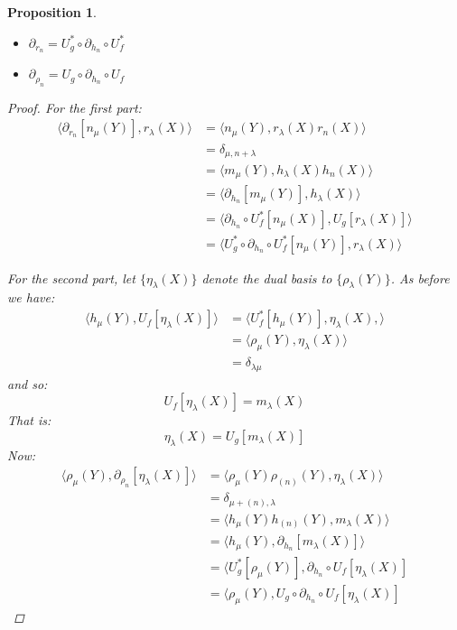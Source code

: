 \documentclass[12pt,dvips]{amsart}
\newtheorem{proposition}{Proposition}[section]
\begin{document}
\begin{proposition}
\par\bigskip
\begin{itemize}
\item $ \partial_{r_n} = U^*_g \circ \partial_{h_n} \circ U^*_f $
\item $ \partial_{\rho_n} = U_g \circ \partial_{h_n} \circ U_f $
\end{itemize}
\begin{proof}
For the first part:
\begin{align*}
\langle \partial_{r_n}[ n_\mu(Y) ], r_\lambda(X) \rangle 
& =  \langle n_\mu(Y), r_\lambda(X) r_n(X) \rangle \\
& =  \delta_{\mu, n + \lambda} \\
& =  \langle m_\mu(Y), h_\lambda(X) h_n(X) \rangle \\
& =  \langle \partial_{h_n}[m_\mu(Y)], h_\lambda(X) \rangle \\
& =  \langle \partial_{h_n} \circ U^*_{f}[n_\mu(X)], U_{g}[r_\lambda(X)] \rangle \\
& =  \langle U^*_{g} \circ \partial_{h_n} \circ U^*_{f}[n_\mu(Y)], r_\lambda(X) \rangle
\end{align*}

For the second part, let $\{\eta_\lambda(X)\}$ denote the dual basis to $\{\rho_\lambda(Y)\}$. 
As before we have:
\begin{align*}
\langle h_\mu(Y), U_{f}[\eta_\lambda(X)] \rangle 
& =  \langle U^*_{f}[h_\mu(Y)], \eta_\lambda(X),  \rangle \\
& =  \langle \rho_\mu(Y), \eta_\lambda(X)\rangle \\
& =  \delta_{\lambda \mu}
\end{align*}
and so:
$$ U_{f}[\eta_\lambda(X)] = m_\lambda(X) $$
That is:
$$ \eta_\lambda(X) = U_{g}[m_\lambda(X)] $$
Now:
\begin{align*}
\langle \rho_\mu(Y), \partial_{\rho_n}[\eta_\lambda(X)] \rangle
& =  \langle \rho_\mu(Y) \rho_{(n)}(Y), \eta_\lambda(X) \rangle \\
& =  \delta_{\mu + (n), \lambda} \\
& =  \langle h_\mu(Y) h_{(n)}(Y), m_\lambda(X) \rangle \\
& =  \langle h_\mu(Y), \partial_{h_n}[m_\lambda(X)] \rangle \\
& =  \langle U^*_g[\rho_\mu(Y)], \partial_{h_n} \circ U_f[\eta_\lambda(X)] \\
& =  \langle \rho_\mu(Y), U_g \circ \partial_{h_n} \circ U_f[\eta_\lambda(X)]
\end{align*} 
\end{proof}
\qedhere
\end{proposition}
\end{document}

